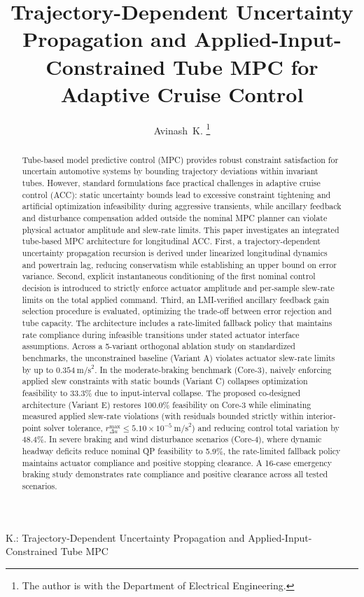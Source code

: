 \documentclass[journal]{IEEEtran}
\begin{document}
\title{Trajectory-Dependent Uncertainty Propagation and Applied-Input-Constrained Tube MPC for Adaptive Cruise Control}

\author{Avinash~K.%
\thanks{The author is with the Department of Electrical Engineering.}}

%
{K.: Trajectory-Dependent Uncertainty Propagation and Applied-Input-Constrained Tube MPC}

\maketitle

\begin{abstract}
Tube-based model predictive control (MPC) provides robust constraint satisfaction for uncertain automotive systems by bounding trajectory deviations within invariant tubes. However, standard formulations face practical challenges in adaptive cruise control (ACC): static uncertainty bounds lead to excessive constraint tightening and artificial optimization infeasibility during aggressive transients, while ancillary feedback and disturbance compensation added outside the nominal MPC planner can violate physical actuator amplitude and slew-rate limits. This paper investigates an integrated tube-based MPC architecture for longitudinal ACC. First, a trajectory-dependent uncertainty propagation recursion is derived under linearized longitudinal dynamics and powertrain lag, reducing conservatism while establishing an upper bound on error variance. Second, explicit instantaneous conditioning of the first nominal control decision is introduced to strictly enforce actuator amplitude and per-sample slew-rate limits on the total applied command. Third, an LMI-verified ancillary feedback gain selection procedure is evaluated, optimizing the trade-off between error rejection and tube capacity. The architecture includes a rate-limited fallback policy that maintains rate compliance during infeasible transitions under stated actuator interface assumptions. Across a 5-variant orthogonal ablation study on standardized benchmarks, the unconstrained baseline (Variant A) violates actuator slew-rate limits by up to $0.354~\text{m/s}^2$. In the moderate-braking benchmark (Core-3), naively enforcing applied slew constraints with static bounds (Variant C) collapses optimization feasibility to 33.3\% due to input-interval collapse. The proposed co-designed architecture (Variant E) restores 100.0\% feasibility on Core-3 while eliminating measured applied slew-rate violations (with residuals bounded strictly within interior-point solver tolerance, $r_{\Delta u}^{\max} \le 5.10 \times 10^{-5}~\text{m/s}^2$) and reducing control total variation by 48.4\%. In severe braking and wind disturbance scenarios (Core-4), where dynamic headway deficits reduce nominal QP feasibility to 5.9\%, the rate-limited fallback policy maintains actuator compliance and positive stopping clearance. A 16-case emergency braking study demonstrates rate compliance and positive clearance across all tested scenarios.
\end{abstract}
\end{document}
